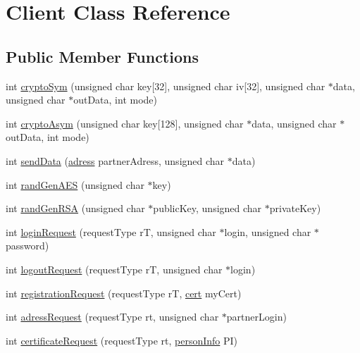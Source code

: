 \hypertarget{class_client}{\section{Client Class Reference}
\label{class_client}
}
\subsection*{Public Member Functions}
\begin{DoxyCompactItemize}
\item 
int \hyperlink{class_client_ac152cb465f5524a7bd38090c1f57089b}{crypto\-Sym} (unsigned char key\mbox{[}32\mbox{]}, unsigned char iv\mbox{[}32\mbox{]}, unsigned char $\ast$data, unsigned char $\ast$out\-Data, int mode)
\item 
int \hyperlink{class_client_ac20bb1b1e5c21bdb58c45c6474bcae9b}{crypto\-Asym} (unsigned char key\mbox{[}128\mbox{]}, unsigned char $\ast$data, unsigned char $\ast$out\-Data, int mode)
\item 
int \hyperlink{class_client_a4acc927594f9e12a5ae9147c335f1ae2}{send\-Data} (\hyperlink{structadress}{adress} partner\-Adress, unsigned char $\ast$data)
\item 
int \hyperlink{class_client_ad0dbe29b7e5d19ca06f45730c08ca051}{rand\-Gen\-A\-E\-S} (unsigned char $\ast$key)
\item 
int \hyperlink{class_client_a0c8a7fcdcea7013878578fd840eef464}{rand\-Gen\-R\-S\-A} (unsigned char $\ast$public\-Key, unsigned char $\ast$private\-Key)
\item 
int \hyperlink{class_client_a60cfdb762ec279a63274e3a46430ac9c}{login\-Request} (request\-Type r\-T, unsigned char $\ast$login, unsigned char $\ast$password)
\item 
int \hyperlink{class_client_a5a76ae37a411c76b2ce2e8cc4fc8fbd9}{logout\-Request} (request\-Type r\-T, unsigned char $\ast$login)
\item 
int \hyperlink{class_client_aff7805d64cf3c1ee8f76eced3128e88b}{registration\-Request} (request\-Type r\-T, \hyperlink{structcert}{cert} my\-Cert)
\item 
int \hyperlink{class_client_a2bfb998ce32f3e80afb12b6cfe7720b2}{adress\-Request} (request\-Type rt, unsigned char $\ast$partner\-Login)
\item 
int \hyperlink{class_client_a5c39a43e0d8020dba7bfcdb90850175b}{certificate\-Request} (request\-Type rt, \hyperlink{structperson_info}{person\-Info} P\-I)
\end{DoxyCompactItemize}


